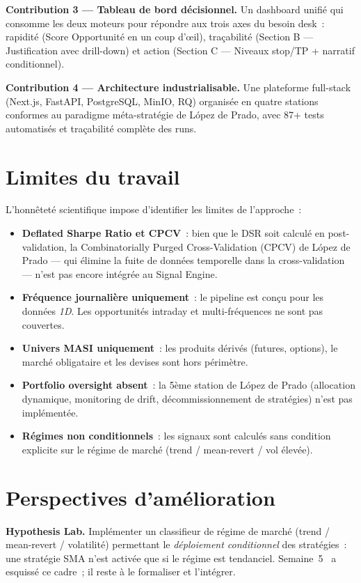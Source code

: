 \textbf{Contribution 3 — Tableau de bord décisionnel.}
Un dashboard unifié qui consomme les deux moteurs pour répondre aux trois axes du
besoin desk~: rapidité (Score Opportunité en un coup d'œil), traçabilité (Section B
— Justification avec drill-down) et action (Section C — Niveaux stop/TP + narratif
conditionnel).

\textbf{Contribution 4 — Architecture industrialisable.}
Une plateforme full-stack (Next.js, FastAPI, PostgreSQL, MinIO, RQ) organisée en
quatre stations conformes au paradigme méta-stratégie de López de Prado, avec
87+ tests automatisés et traçabilité complète des runs.

\section*{Limites du travail}

L'honnêteté scientifique impose d'identifier les limites de l'approche~:

\begin{itemize}
    \item \textbf{Deflated Sharpe Ratio et CPCV}~: bien que le DSR soit calculé
    en post-validation, la Combinatorially Purged Cross-Validation (CPCV) de López
    de Prado — qui élimine la fuite de données temporelle dans la cross-validation —
    n'est pas encore intégrée au Signal Engine.
    \item \textbf{Fréquence journalière uniquement}~: le pipeline est conçu pour
    les données \textit{1D}. Les opportunités intraday et multi-fréquences ne sont
    pas couvertes.
    \item \textbf{Univers MASI uniquement}~: les produits dérivés (futures, options),
    le marché obligataire et les devises sont hors périmètre.
    \item \textbf{Portfolio oversight absent}~: la 5ème station de López de Prado
    (allocation dynamique, monitoring de drift, décommissionnement de stratégies)
    n'est pas implémentée.
    \item \textbf{Régimes non conditionnels}~: les signaux sont calculés sans
    condition explicite sur le régime de marché (trend / mean-revert / vol élevée).
\end{itemize}

\section*{Perspectives d'amélioration}

\textbf{Hypothesis Lab.}
Implémenter un classifieur de régime de marché (trend / mean-revert / volatilité)
permettant le \emph{déploiement conditionnel} des stratégies~: une stratégie SMA
n'est activée que si le régime est tendanciel. Semaine~5~\cite{rapport_s5} a esquissé
ce cadre~; il reste à le formaliser et l'intégrer.

